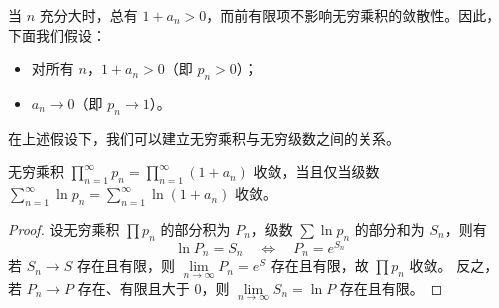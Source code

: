 当 $n$ 充分大时，总有 $1 + a_n > 0$，而前有限项不影响无穷乘积的敛散性。因此，下面我们假设：
\begin{itemize}
	\item  对所有 $n$，$1 + a_n > 0$（即 $p_n > 0$）；
	
	\item $a_n \to 0$（即 $p_n \to 1$）。
\end{itemize}
在上述假设下，我们可以建立无穷乘积与无穷级数之间的关系。
\begin{proposition}\label{无穷乘积与无穷级数之间的关系}
	无穷乘积 $\displaystyle \prod_{n=1}^{\infty} p_n = \prod_{n=1}^{\infty} (1 + a_n)$ 收敛，当且仅当级数 $\displaystyle \sum_{n=1}^{\infty} \ln p_n = \sum_{n=1}^{\infty} \ln(1 + a_n)$ 收敛。
	
\end{proposition}
\begin{proof}
	设无穷乘积 $\prod p_n$ 的部分积为 $P_n$，级数 $\sum \ln p_n$ 的部分和为 $S_n$，则有
	\[
	\ln P_n = S_n \quad \Longleftrightarrow \quad P_n = e^{S_n}
	\]
	若 $S_n \to S$ 存在且有限，则 $\lim\limits_{n \to \infty} P_n = e^S$ 存在且有限，故 $\prod p_n$ 收敛。
	反之，若 $P_n \to P$ 存在、有限且大于 $0$，则 $\lim\limits_{n \to \infty} S_n = \ln P$ 存在且有限。
\end{proof}

